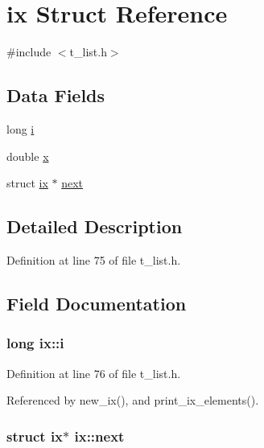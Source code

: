 \hypertarget{structix}{\section{ix Struct Reference}
\label{structix}
}


{\ttfamily \#include $<$t\-\_\-list.\-h$>$}

\subsection*{Data Fields}
\begin{DoxyCompactItemize}
\item 
long \hyperlink{structix_a3b7a2257ea9b4b1d7e904b0043e51ddc}{i}
\item 
double \hyperlink{structix_a0fd2a5f2842ddbc1eab6160be5cfb726}{x}
\item 
struct \hyperlink{structix}{ix} $\ast$ \hyperlink{structix_a02d741a424b23d5074b82afe03193322}{next}
\end{DoxyCompactItemize}


\subsection{Detailed Description}


Definition at line 75 of file t\-\_\-list.\-h.



\subsection{Field Documentation}
\hypertarget{structix_a3b7a2257ea9b4b1d7e904b0043e51ddc}{
\subsubsection[{i}]{\setlength{\rightskip}{0pt plus 5cm}long ix\-::i}}\label{structix_a3b7a2257ea9b4b1d7e904b0043e51ddc}


Definition at line 76 of file t\-\_\-list.\-h.



Referenced by new\-\_\-ix(), and print\-\_\-ix\-\_\-elements().

\hypertarget{structix_a02d741a424b23d5074b82afe03193322}{
\subsubsection[{next}]{\setlength{\rightskip}{0pt plus 5cm}struct {\bf ix}$\ast$ ix\-::next}}\label{structix_a02d741a424b23d5074b82afe03193322}



